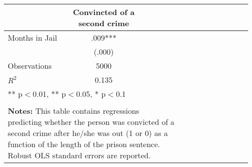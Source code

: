 \begin{tabular}{l*{14}{c}}
                    &\multicolumn{1}{c}{Convincted of a second crime}\\
\hline
Months in Jail      &       .009***\\
                    &    (.000)   \\
\hline
Observations        &        5000   \\
\(R^{2}\)           &       0.135   \\
\multicolumn{6}{p{0.6\linewidth}}{\small *** p$<$0.01, ** p$<$0.05, * p$<$0.1} \\
\\
\multicolumn{6}{p{0.6\linewidth}}{\small \textbf{Notes:} This table contains regressions predicting whether the person was convicted of a second crime after he/she was out (1 or 0) as a function of the length of the prison sentence. Robust OLS standard errors are reported.} \\
\end{tabular}
